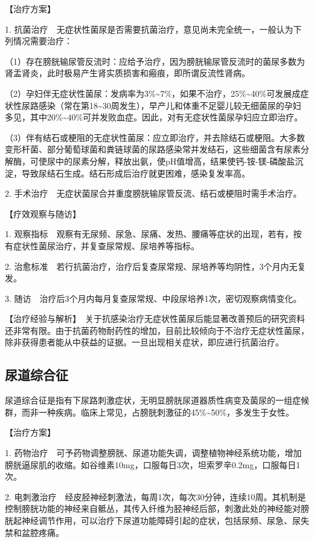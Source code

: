 【治疗方案】

1.
抗菌治疗　无症状性菌尿是否需要抗菌治疗，意见尚未完全统一，一般认为下列情况需要治疗：

（1）存在膀胱输尿管反流时：应给予治疗，因为膀胱输尿管反流时的菌尿多数为肾盂肾炎，此时极易产生肾实质损害和瘢痕，即所谓反流性肾病。

（2）孕妇伴无症状性菌尿：发病率为3\%\textasciitilde{}7\%，如果不治疗，25\%\textasciitilde{}40\%可发展成症状性尿路感染（常在第18\textasciitilde{}30周发生），早产儿和体重不足婴儿较无细菌尿的孕妇多见，其中20\%\textasciitilde{}40\%可并发败血症。因此，对有无症状性菌尿孕妇应立即治疗。

（3）伴有结石或梗阻的无症状性菌尿：应立即治疗，并去除结石或梗阻。大多数变形杆菌、部分葡萄球菌和粪链球菌的尿路感染常并发结石，这些细菌含有尿素分解酶，可使尿中的尿素分解，释放出氨，使pH值增高，结果使钙-铵-镁-磷酸盐沉淀，导致尿结石生成。结石形成后治疗就更困难，感染复发率高。

2. 手术治疗　无症状菌尿合并重度膀胱输尿管反流、结石或梗阻时需手术治疗。

【疗效观察与随访】

1.
观察指标　观察有无尿频、尿急、尿痛、发热、腰痛等症状的出现，若有，按有症状性菌尿治疗，并复查尿常规、尿培养等指标。

2.
治愈标准　若行抗菌治疗，治疗后复查尿常规、尿培养等均阴性，3个月内无复发。

3. 随访　治疗后3个月内每月复查尿常规、中段尿培养1次，密切观察病情变化。

【治疗经验与解析】　关于抗感染治疗无症状性菌尿后能显著改善预后的研究资料还非常有限。由于抗菌药物耐药性的增加，目前比较倾向于不治疗无症状性菌尿，除非获得患者能从中获益的证据。一旦出现相关症状，即应进行抗菌治疗。

\subsection{尿道综合征}

尿道综合征是指有下尿路刺激症状，无明显膀胱尿道器质性病变及菌尿的一组症候群，而非一种疾病。临床上常见，占膀胱刺激征的45\%\textasciitilde{}50\%，多发生于女性。

【治疗方案】

1.
药物治疗　可予药物调整膀胱、尿道功能失调，调整植物神经系统功能，增加膀胱逼尿肌的收缩。如谷维素10mg，口服每日3次，坦索罗辛0.2mg，口服每日1次。

2.
电刺激治疗　经皮胫神经刺激法，每周1次，每次30分钟，连续10周。其机制是控制膀胱功能的神经来自骶丛，其传入纤维为胫神经后部，刺激此处的神经能对膀胱起神经调节作用，可以治疗下尿道功能障碍引起的症状，包括尿频、尿急、尿失禁和盆腔疼痛。

